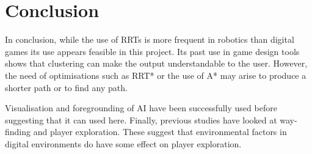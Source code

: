 \documentclass[journal]{IEEEtran}
\begin{document}
\section{Conclusion}
In conclusion, while the use of RRTs is more frequent in robotics than digital games its use appears feasible in this project. Its past use in game design tools shows that clustering can make the output understandable to the user. However, the need of optimisations such as RRT* or the use of A* may arise to produce a shorter path or to find any path. 

Visualisation and foregrounding of AI have been successfully used before suggesting that it can used here. Finally, previous studies have looked at way-finding and player exploration. These suggest that environmental factors in digital environments do have some effect on player exploration.






\end{document}
